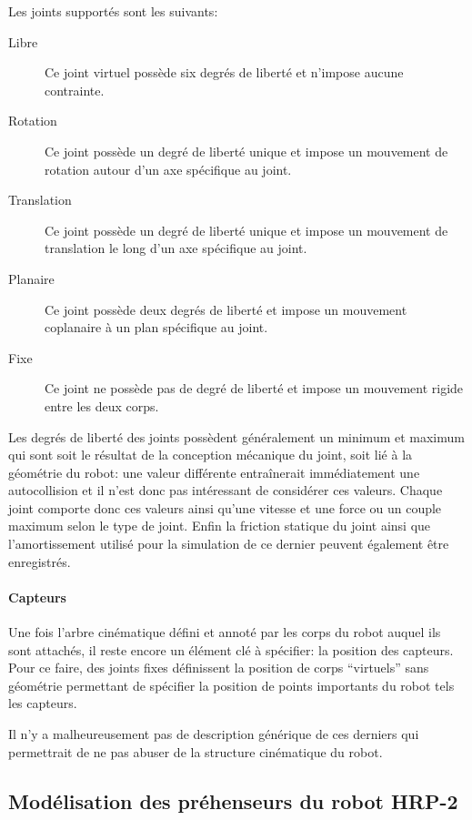 Les joints supportés sont les suivants:
\begin{description}
\item[Libre] Ce joint virtuel possède six degrés de liberté et
  n'impose aucune contrainte.
\item[Rotation] Ce joint possède un degré de liberté unique et impose
  un mouvement de rotation autour d'un axe spécifique au joint.
\item[Translation] Ce joint possède un degré de liberté unique et
  impose un mouvement de translation le long d'un axe spécifique au
  joint.
\item[Planaire] Ce joint possède deux degrés de liberté et impose un
  mouvement coplanaire à un plan spécifique au joint.
\item[Fixe] Ce joint ne possède pas de degré de liberté et impose un
  mouvement rigide entre les deux corps.
\end{description}

Les degrés de liberté des joints possèdent généralement un minimum et
maximum qui sont soit le résultat de la conception mécanique du joint,
soit lié à la géométrie du robot: une valeur différente entraînerait
immédiatement une autocollision et il n'est donc pas intéressant de
considérer ces valeurs. Chaque joint comporte donc ces valeurs ainsi
qu'une vitesse et une force ou un couple maximum selon le type de
joint. Enfin la friction statique du joint ainsi que l'amortissement
utilisé pour la simulation de ce dernier peuvent également être
enregistrés.


\paragraph{Capteurs}

Une fois l'arbre cinématique défini et annoté par les corps du robot
auquel ils sont attachés, il reste encore un élément clé à spécifier:
la position des capteurs. Pour ce faire, des joints fixes définissent
la position de corps ``virtuels'' sans géométrie permettant de
spécifier la position de points importants du robot tels les capteurs.

Il n'y a malheureusement pas de description générique de ces derniers
qui permettrait de ne pas abuser de la structure cinématique du robot.


\subsection{Modélisation des préhenseurs du robot HRP-2}


